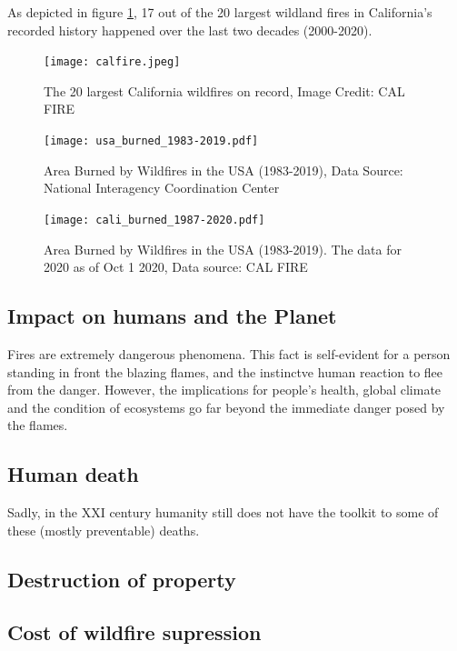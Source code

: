   As depicted in figure \ref{fig:caltop20}, 17 out of the 20 largest wildland fires in California's recorded history happened over the last two decades (2000-2020).


  \begin{figure}\label{fig:caltop20}
    \texttt{[image: calfire.jpeg]}
    \caption{The 20 largest California wildfires on record, Image Credit: CAL FIRE\cite{calfire}}
  \end{figure}

  \begin{figure}
    \texttt{[image: usa\_burned\_1983-2019.pdf]}
    \caption{Area Burned by Wildfires in the USA (1983-2019), Data Source: National Interagency Coordination Center\cite{NICI}}
  \end{figure}

  \begin{figure}
    \texttt{[image: cali\_burned\_1987-2020.pdf]}
    \caption{Area Burned by Wildfires in the USA (1983-2019). The data for 2020 as of Oct 1 2020, Data source: CAL FIRE\cite{calfire}}
  \end{figure}

  \subsection{Impact on humans and the Planet}

  Fires are extremely dangerous phenomena.
  This fact is self-evident for a person standing in front the blazing flames, and the instinctve human reaction to flee from the danger.
  However, the implications for people's health, global climate and the condition of ecosystems go far beyond the immediate danger posed by the flames.
  
  \subsection{Human death}
  Sadly, in the XXI century humanity still does not have the toolkit to some of these (mostly preventable) deaths.

  \subsection{Destruction of property}

  \subsection{Cost of wildfire supression}
    
